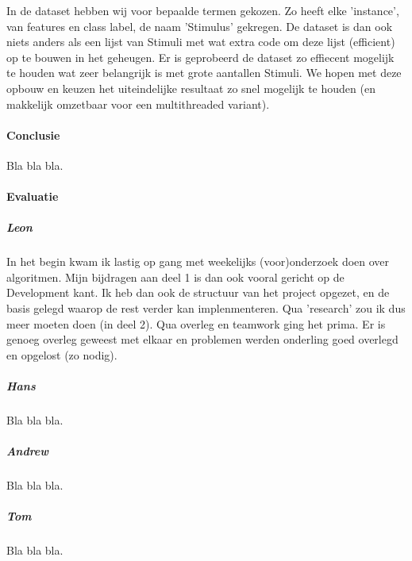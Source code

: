 \documentclass[a4paper,12pt,pdf]{article}
\begin{document}
			In de dataset hebben wij voor bepaalde termen gekozen. Zo heeft elke 'instance', van features en class label, de naam 'Stimulus'
			gekregen. De dataset is dan ook niets anders als een lijst van Stimuli met wat extra code om deze lijst (efficient) op te
			bouwen in het geheugen. Er is geprobeerd de dataset zo effiecent mogelijk te houden wat zeer belangrijk is met grote aantallen
			Stimuli. We hopen met deze opbouw en keuzen het uiteindelijke resultaat zo snel mogelijk te houden (en makkelijk omzetbaar
			voor een multithreaded variant).
	
	\paragraph{Conclusie}
		Bla bla bla.
	
	\paragraph{Evaluatie}
		\subparagraph{Leon}
			In het begin kwam ik lastig op gang met weekelijks (voor)onderzoek doen over algoritmen.
			Mijn bijdragen aan deel 1 is dan ook vooral gericht op de Development kant. Ik heb dan ook
			de structuur van het project opgezet, en de basis gelegd waarop de rest verder kan implenmenteren.
			Qua 'research' zou ik dus meer moeten doen (in deel 2). Qua overleg en teamwork ging het prima.
			Er is genoeg overleg geweest met elkaar en problemen werden onderling goed overlegd en opgelost (zo nodig).
		
		\subparagraph{Hans}
			Bla bla bla.
		
		\subparagraph{Andrew}
			Bla bla bla.
		
		\subparagraph{Tom}
			Bla bla bla.
	
\end{document}
